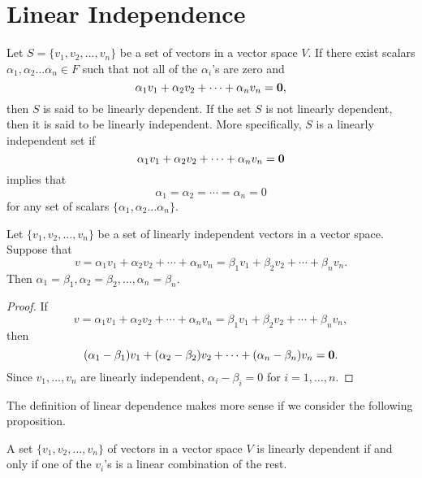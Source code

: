  
\section{Linear Independence}
 

Let $S = \{v_1, v_2, \ldots, v_n\}$ be a set of vectors in a vector
space $V$. If there exist scalars $\alpha_1, \alpha_2 \ldots \alpha_n
\in F$ such that not all of the $\alpha_i$'s are zero and 
\[
\alpha_1 v_1 + \alpha_2 v_2 + \cdots + \alpha_n v_n = {\bold 0 },
\]
then $S$ is said to be {\bfi linearly
dependent}. If the set $S$ is not linearly
dependent, then it is said to be {\bfi linearly
independent}. More specifically, $S$ is a
linearly independent set if
\[ 
\alpha_1 v_1 + \alpha_2 v_2 + \cdots + \alpha_n v_n = {\bold 0 }
\]
implies that
\[
\alpha_1 = \alpha_2 = \cdots = \alpha_n = 0
\]
for any set of scalars $\{ \alpha_1, \alpha_2 \ldots \alpha_n \}$.


 
\begin{proposition}
Let $\{ v_1, v_2, \ldots, v_n \}$ be a set of linearly independent
vectors in a vector space. Suppose that 
\[
v = \alpha_1 v_1 + \alpha_2 v_2 + \cdots + \alpha_n v_n
= \beta_1 v_1 + \beta_2 v_2 + \cdots + \beta_n v_n.
\]
Then $\alpha_1 = \beta_1, \alpha_2 = \beta_2, \ldots, \alpha_n =
\beta_n$. 
\end{proposition}

\begin{proof}
If 
\[
v = \alpha_1 v_1 + \alpha_2 v_2 + \cdots + \alpha_n v_n
= \beta_1 v_1 + \beta_2 v_2 + \cdots + \beta_n v_n,
\]
then
\[
(\alpha_1 - \beta_1) v_1 + (\alpha_2 - \beta_2) v_2 + \cdots +
(\alpha_n - \beta_n) v_n = {\bold 0}.
\]
Since $v_1, \ldots, v_n$ are linearly independent, $\alpha_i - \beta_i
=0$ for $i = 1, \ldots, n$.
\end{proof}
 

\medskip


The definition of linear dependence makes more sense if we consider
the following proposition.

 
\begin{proposition}
A set $\{ v_1, v_2, \dots, v_n \}$ of vectors in a vector space $V$ is
linearly dependent if and only if one of the $v_i$'s is a linear
combination of the rest. 
\end{proposition}


